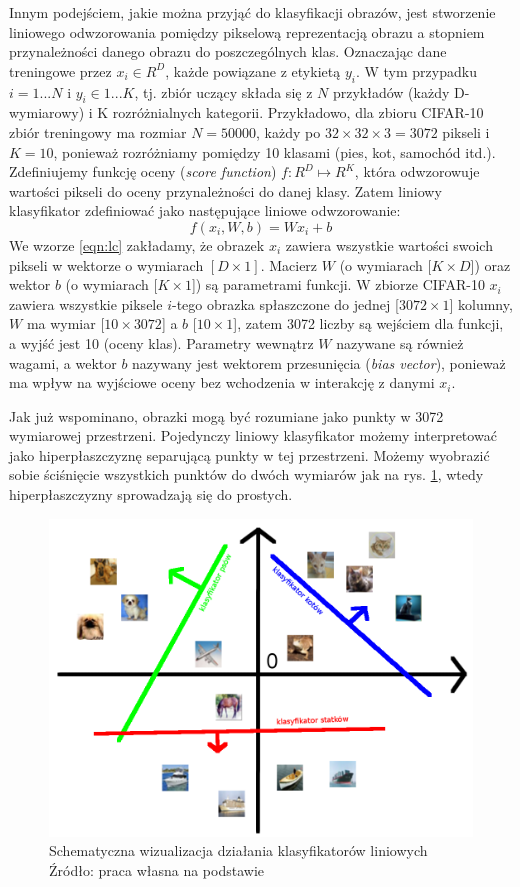 Innym podejściem, jakie można przyjąć do klasyfikacji obrazów, jest stworzenie liniowego odwzorowania pomiędzy pikselową reprezentacją obrazu a stopniem przynależności danego obrazu do poszczególnych klas.
Oznaczając dane treningowe przez $x_i \in R^D$, każde powiązane z etykietą $y_i$.
W tym przypadku $i = 1 ... N$ i $y_i \in 1 ... K$, tj. zbiór uczący składa się z $N$ przykładów (każdy D-wymiarowy) i K rozróżnialnych kategorii.
Przykładowo, dla zbioru CIFAR-10 zbiór treningowy ma rozmiar $N = 50000$, każdy po $32 \times 32 \times 3 = 3072$ pikseli i $K = 10$, ponieważ rozróżniamy pomiędzy 10 klasami (pies, kot, samochód itd.).
Zdefiniujemy funkcję oceny (\textit{score function}) $f : R^D \mapsto R^K$, która odwzorowuje wartości pikseli do oceny przynależności do danej klasy.
Zatem liniowy klasyfikator zdefiniować jako następujące liniowe odwzorowanie:
\begin{equation}\label{eqn:lc}
f(x_i,W,b) = Wx_i + b
\end{equation}
We wzorze \ref{eqn:lc} zakładamy, że obrazek $x_i$ zawiera wszystkie wartości swoich pikseli w wektorze o wymiarach $[D \times 1]$.
Macierz $W$ (o wymiarach $[K \times D$]) oraz wektor $b$ (o wymiarach [$K \times 1$]) są parametrami funkcji.
W zbiorze CIFAR-10 $x_i$ zawiera wszystkie piksele $i$-tego obrazka spłaszczone do jednej [$3072 \times 1$] kolumny, $W$ ma wymiar [$10 \times 3072$] a $b$ [$10 \times 1$], zatem 3072 liczby są wejściem dla funkcji, a wyjść jest 10 (oceny klas).
Parametry wewnątrz $W$ nazywane są również wagami, a wektor $b$ nazywany jest wektorem przesunięcia (\textit{bias vector}), ponieważ ma wpływ na wyjściowe oceny bez wchodzenia w interakcję z danymi $x_i$. \cite{cs231n}

Jak już wspominano, obrazki mogą być rozumiane jako punkty w 3072 wymiarowej przestrzeni.
Pojedynczy liniowy klasyfikator możemy interpretować jako hiperpłaszczyznę separującą punkty w tej przestrzeni.
Możemy wyobrazić sobie ściśnięcie wszystkich punktów do dwóch wymiarów jak na rys. \ref{fig:cartoon_class}, wtedy hiperpłaszczyzny sprowadzają się do prostych.

\begin{figure}[h!tb]
	 \centering
	 \includegraphics[width = 0.75\linewidth]{img/klas_cartoon}
	 \caption{Schematyczna wizualizacja działania klasyfikatorów liniowych \\
              Źródło: praca własna na podstawie \cite{cs231n}}
	 \label{fig:cartoon_class}
\end{figure}

